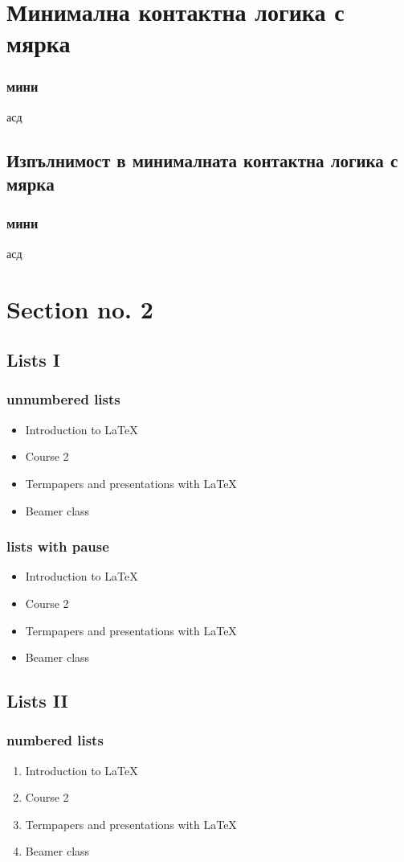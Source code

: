 \documentclass{beamer}
\begin{document}
\section{Минимална контактна логика с мярка}
\begin{frame}\frametitle{мини}
асд
\end{frame}

\subsection{Изпълнимост в минималната контактна логика с мярка}
\begin{frame}\frametitle{мини}
асд
\end{frame}

\section{Section no. 2} 
\subsection{Lists I}
\begin{frame}\frametitle{unnumbered lists}
\begin{itemize}
\item Introduction to  \LaTeX  
\item Course 2 
\item Termpapers and presentations with \LaTeX 
\item Beamer class
\end{itemize} 
\end{frame}

\begin{frame}\frametitle{lists with pause}
\begin{itemize}
\item Introduction to  \LaTeX \pause 
\item Course 2 \pause 
\item Termpapers and presentations with \LaTeX \pause 
\item Beamer class
\end{itemize} 
\end{frame}

\subsection{Lists II}
\begin{frame}\frametitle{numbered lists}
\begin{enumerate}
\item Introduction to  \LaTeX  
\item Course 2 
\item Termpapers and presentations with \LaTeX 
\item Beamer class
\end{enumerate}
\end{frame}
\end{document}
